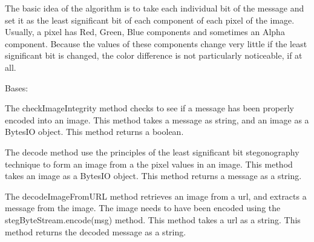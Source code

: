 \documentclass[letterpaper,10pt,english]{sphinxmanual}
\begin{document}
The basic idea of the algorithm is to take each individual bit of the message and set it as the least significant bit of each component of each pixel of the image. Usually, a pixel has Red, Green, Blue components and sometimes an Alpha component. Because the values of these components change very little if the least significant bit is changed, the color difference is not particularly noticeable, if at all.
\label{Image_Manipulation:module-Image_Manipulation.stegByteStream}

\begin{fulllineitems}
\label{Image_Manipulation:Image_Manipulation.stegByteStream.Steg}
Bases: 

\begin{fulllineitems}
\label{Image_Manipulation:Image_Manipulation.stegByteStream.Steg.checkImageIntegrity}
The checkImageIntegrity method checks to see if a message has been properly encoded into an image.
This method takes a message as string, and an image as a BytesIO object.
This method returns a boolean.

\end{fulllineitems}


\begin{fulllineitems}
\label{Image_Manipulation:Image_Manipulation.stegByteStream.Steg.decode}
The decode method use the principles of the least significant bit stegonography
technique to form an image from a the pixel values in an image.
This method takes an image as a BytesIO object.
This method returns a message as a string.

\end{fulllineitems}


\begin{fulllineitems}
\label{Image_Manipulation:Image_Manipulation.stegByteStream.Steg.decodeImageFromURL}
The decodeImageFromURL method retrieves an image from a url, and extracts a message from the
image. The image needs to have been encoded using the stegByteStream.encode(msg) method.
This method takes a url as a string.
This method returns the decoded message as a string.


\end{fulllineitems}
\end{fulllineitems}
\end{document}
